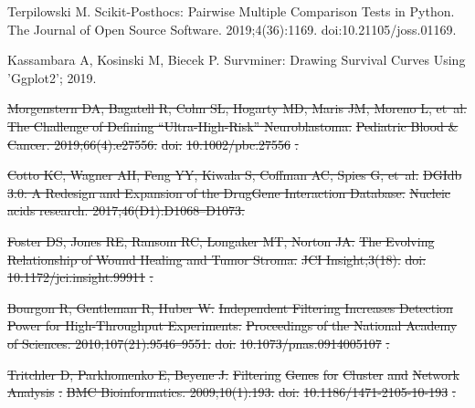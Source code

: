\documentclass[10pt,letterpaper]{article}
\providecommand{\DIFdeltex}[1]{{\protect\color{red}\sout{#1}}}                      %
\providecommand{\DIFdelbegin}{} %
\providecommand{\DIFdel}[1]{\texorpdfstring{\DIFdeltex{#1}}{}} %
\newcommand{\DIFscaledelfig}{0.5}
\newlength{\DIFdelgraphicswidth} %
\newlength{\DIFdelgraphicsheight} %
\newcommand{\DIFdelincludegraphics}[2][]{%
\sbox{\DIFdelgraphicsbox}{\DIFOincludegraphics[#1]{#2}}%
\settoboxwidth{\DIFdelgraphicswidth}{\DIFdelgraphicsbox} %
\settoboxtotalheight{\DIFdelgraphicsheight}{\DIFdelgraphicsbox} %
\scalebox{\DIFscaledelfig}{%
\parbox[b]{\DIFdelgraphicswidth}{\usebox{\DIFdelgraphicsbox}\\[-\baselineskip] \rule{\DIFdelgraphicswidth}{0em}}\llap{\resizebox{\DIFdelgraphicswidth}{\DIFdelgraphicsheight}{%
\setlength{\unitlength}{\DIFdelgraphicswidth}%
\begin{picture}(1,1)%
\thicklines\linethickness{2pt} %
{\color[rgb]{1,0,0}\put(0,0){\framebox(1,1){}}}%
{\color[rgb]{1,0,0}\put(0,0){\line( 1,1){1}}}%
{\color[rgb]{1,0,0}\put(0,1){\line(1,-1){1}}}%
\end{picture}%
}\hspace*{3pt}}} %
} %
\DeclareRobustCommand{\DIFdelbegin}{\DIFOdelbegin \let\includegraphics\DIFdelincludegraphics} %
\begin{document}
\begin{thebibliography}{10}
	Terpilowski M.
	\newblock Scikit-Posthocs: {{Pairwise}} Multiple Comparison Tests in
	{{Python}}.
	\newblock The Journal of Open Source Software. 2019;4(36):1169.
	\newblock doi:{10.21105/joss.01169}.

	Kassambara A, Kosinski M, Biecek P.
	\newblock Survminer: Drawing Survival Curves Using 'Ggplot2'; 2019.
	\DIFdelbegin %

\DIFdel{Morgenstern DA, Bagatell R, Cohn SL, Hogarty MD, Maris JM, Moreno L, et~al.
	}%
\DIFdel{The Challenge of Defining ``Ultra-High-Risk'' Neuroblastoma.
	}%
\DIFdel{Pediatric Blood \& Cancer. 2019;66(4):e27556.
	}%
\DIFdel{doi:}%
\DIFdel{10.1002/pbc.27556}%
\DIFdel{.
	}%

\DIFdel{Cotto KC, Wagner AH, Feng YY, Kiwala S, Coffman AC, Spies G, et~al.
	}%
\DIFdel{DGIdb}%
\DIFdel{3.0: A Redesign and Expansion of the Drug\textendash{}Gene
	Interaction Database.
	}%
\DIFdel{Nucleic acids research. 2017;46(D1):D1068--D1073.
	}%

\DIFdel{Foster DS, Jones RE, Ransom RC, Longaker MT, Norton JA.
	}%
\DIFdel{The Evolving Relationship of Wound Healing and Tumor Stroma.
	}%
\DIFdel{JCI Insight;3(18).
	}%
\DIFdel{doi:}%
\DIFdel{10.1172/jci.insight.99911}%
\DIFdel{.
	}%

\DIFdel{Bourgon R, Gentleman R, Huber W.
	}%
\DIFdel{Independent Filtering Increases Detection Power for High-Throughput
	Experiments.
	}%
\DIFdel{Proceedings of the National Academy of Sciences.
	2010;107(21):9546--9551.
	}%
\DIFdel{doi:}%
\DIFdel{10.1073/pnas.0914005107}%
\DIFdel{.
	}%

\DIFdel{Tritchler D, Parkhomenko E, Beyene J.
	}%
\DIFdel{Filtering }%
\DIFdel{Genes}%
\DIFdel{for }%
\DIFdel{Cluster}%
\DIFdel{and }%
\DIFdel{Network Analysis}%
\DIFdel{.
	}%
\DIFdel{BMC Bioinformatics. 2009;10(1):193.
	}%
\DIFdel{doi:}%
\DIFdel{10.1186/1471-2105-10-193}%
\DIFdel{.
	}%


\end{thebibliography}
\end{document}
